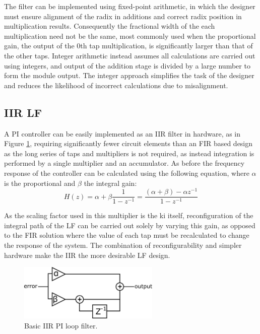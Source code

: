 The filter can be implemented using fixed-point arithmetic, in which the designer must ensure alignment of the radix in additions and correct radix position in multiplication results. Consequently the fractional width of the each multiplication need not be the same, most commonly used when the proportional gain, the output of the 0th tap multiplication, is significantly larger than that of the other taps. Integer arithmetic instead assumes all calculations are carried out using integers, and output of the addition stage is divided by a large number to form the module output. The integer approach simplifies the task of the designer and reduces the likelihood of incorrect calculations due to misalignment.

\subsection{\ac{IIR} \acl{LF}}
A \ac{PI} controller can be easily implemented as an \ac{IIR} filter in hardware, as in Figure \ref{fig:iir_pi}, requiring significantly fewer circuit elements than an \ac{FIR} based design as the long series of taps and multipliers is not required, as instead integration is performed by a single multiplier and an accumulator. As before the frequency response of the controller can be calculated using the following equation, where $\alpha$ is the proportional and $\beta$ the integral gain:
\begin{equation*}
	H(z) = \alpha + \beta\frac{1}{1-z^{-1}} = \frac{(\alpha + \beta) - \alpha z^{-1}}{1-z^{-1}}
\end{equation*}

As the scaling factor used in this multiplier is the \ac{ki} itself, reconfiguration of the integral path of the \acl{LF} can be carried out solely by varying this gain, as opposed to the \ac{FIR} solution where the value of each tap must be recalculated to change the response of the system. The combination of reconfigurability and simpler hardware make the \ac{IIR} the more desirable \ac{LF} design.
\begin{figure}[h]
	\centering
	\includegraphics[width=0.6\textwidth]{../simple_pi.pdf}
	\caption[Basic \ac{IIR} \ac{PI} loop filter]{Basic \ac{IIR} \ac{PI} loop filter.}
	\label{fig:iir_pi}
\end{figure}

